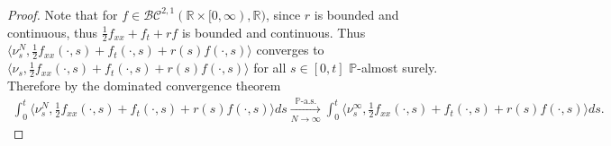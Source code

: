 \documentclass{article}
\newcommand{\B}[1]{\mathbb{#1}}
\newcommand{\C}[1]{\mathcal{#1}}
\begin{document}
\begin{proof}
    Note that for $f\in \C{BC}^{2,1}(\B{R}\times [0,\infty),\B{R})$, since $r$ is bounded and continuous, thus $\frac12f_{xx}+f_t+rf$ is bounded and continuous. Thus $\langle \nu_s^N,\frac12 f_{xx}(\cdot,s)+f_t(\cdot,s)+r(s)f(\cdot,s)\rangle$ converges to $\langle \nu_s,\frac12 f_{xx}(\cdot,s)+f_t(\cdot,s)+r(s)f(\cdot,s)\rangle$ for all $s\in [0,t]$ $\B{P}$-almost surely. %
    Therefore by the dominated convergence theorem
    \begin{align*}\int_0^t \langle \nu^N_s,\frac12 f_{xx}(\cdot,s)+f_t(\cdot,s)+r(s)f(\cdot,s)\rangle ds \xrightarrow[N\to\infty]{\B{P}\text{-a.s.}}\int_0^t \langle \nu^\infty_s,\frac12 f_{xx}(\cdot,s)+f_t(\cdot,s)+r(s)f(\cdot,s)\rangle ds.\end{align*}


\end{proof}
\end{document}

